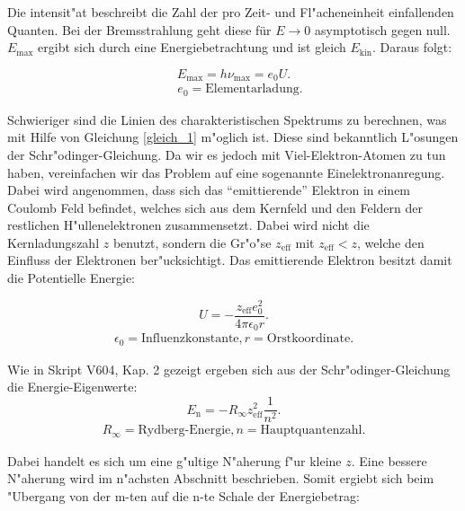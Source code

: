 		Die intensit"at beschreibt die Zahl der pro Zeit- und Fl"acheneinheit einfallenden Quanten.
		Bei der Bremsstrahlung geht diese für $E \rightarrow 0$ asymptotisch gegen null. $E_\mathrm{max}$ ergibt sich durch eine Energiebetrachtung und ist gleich $E_\mathrm{kin}$.
		Daraus folgt:

		\begin{equation}
			E_\mathrm{max} = h\nu_\mathrm{max} = e_\mathrm{0}U. \label{gleich_2}
		\end{equation}
		\begin{eqnarray*}
			\quad e_\mathrm{0} = \text{Elementarladung}.
		\end{eqnarray*}

		Schwieriger sind die Linien des charakteristischen Spektrums zu berechnen, was mit Hilfe von Gleichung \eqref{gleich_1} m"oglich ist.
		Diese sind bekanntlich L"osungen der Schr"odinger-Gleichung. 
		Da wir es jedoch mit Viel-Elektron-Atomen zu tun haben, vereinfachen wir das Problem auf eine sogenannte Einelektronanregung.
		Dabei wird angenommen, dass sich das "`emittierende"' Elektron in einem Coulomb Feld befindet, welches sich aus dem Kernfeld und den Feldern der restlichen H"ullenelektronen zusammensetzt.
		Dabei wird nicht die Kernladungszahl $z$ benutzt, sondern die Gr"o"se $z_\mathrm{eff}$ mit $z_\mathrm{eff} < z$, welche den Einfluss der Elektronen ber"ucksichtigt.
		Das emittierende Elektron besitzt damit die Potentielle Energie:

		\begin{equation}
			U = -\frac{z_\mathrm{eff} e_\mathrm{0}^2}{4 \pi \epsilon_\mathrm{0} r}. \label{gleich_3}
		\end{equation}
		\begin{eqnarray*}
			\epsilon_\mathrm{0} = \text{Influenzkonstante,}\, r = \text{Orstkoordinate}.
		\end{eqnarray*}

		Wie in Skript V604, Kap. 2 gezeigt ergeben sich aus der Schr"odinger-Gleichung die Energie-Eigenwerte: 		
		\begin{equation}
			E_\mathrm{n} = - R_\infty z_\mathrm{eff}^2 \frac{1}{n^2}. \label{gleich_4}
		\end{equation}
		\begin{eqnarray*}
			R_\infty = \text{Rydberg-Energie,}\, n = \text{Hauptquantenzahl}.
		\end{eqnarray*}

		Dabei handelt es sich um eine g"ultige N"aherung f"ur kleine $z$.
		Eine bessere N"aherung wird im n"achsten Abschnitt beschrieben.
		Somit ergiebt sich beim "Ubergang von der m-ten auf die n-te Schale der Energiebetrag:

